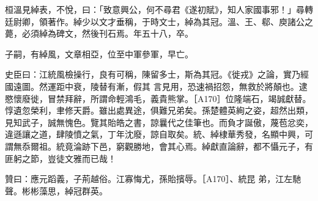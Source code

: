 \begin{pinyinscope}
 桓溫見綽表，不悅，曰：「致意興公，何不尋君《遂初賦》，知人家國事邪！」尋轉廷尉卿，領著作。綽少以文才垂稱，于時文士，綽為其冠。溫、王、郗、庾諸公之薨，必須綽為碑文，然後刊石焉。年五十八，卒。



 子嗣，有綽風，文章相亞，位至中軍參軍，早亡。



 史臣曰：江統風檢操行，良有可稱，陳留多士，斯為其冠。《徙戎》之論，實乃經國遠圖。然運距中衰，陵替有漸，假其
 言見用，恐速禍招怨，無救於將顛也。逮愍懷廢徙，冒禁拜辭，所謂命輕鴻毛，義貴熊掌。［A170］位隆端石，竭誠獻替。惇遺忽榮利，聿修天爵。雖出處異途，俱難兄弟矣。孫楚體英絢之姿，超然出類，見知武子，誠無愧色。覽其貽皓之書，諒曩代之佳筆也。而負才誕傲，蔑苞忿奕，違遜讓之道，肆陵憤之氣，丁年沈廢，諒自取矣。統、綽棣華秀發，名顯中興，可謂無忝爾祖。統竟淪跡下邑，窮觀勝地，會其心焉。綽獻直論辭，都不懾元子，有匪躬之節，豈徒文雅而已哉！



 贊曰：應元蹈義，子荊越俗。江寡悔尤，孫貽擯辱。［A170］、統昆
 弟，江左馳聲。彬彬藻思，綽冠群英。



\end{pinyinscope}